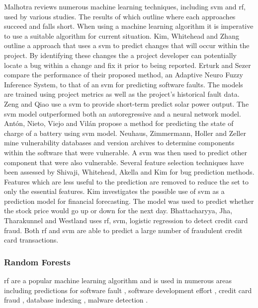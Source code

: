Malhotra reviews numerous machine learning techniques, including \gls{svm} and \gls{rf}, used by various studies\cite{Malhotra2015}. The results of which outline where each approaches succeed and falls short. When using a machine learning algorithm it is imperative to use a suitable algorithm for current situation. Kim, Whitehead and Zhang outline a approach that uses a \gls{svm} to predict changes that will occur within the project\cite{Kim2008}. By identifying these changes the a project developer can potentially locate a bug within a change and fix it prior to being reported. Erturk and Sezer compare the performance of their proposed method, an Adaptive Neuro Fuzzy Inference System, to that of an \gls{svm} for predicting software faults\cite{Erturk2015}. The models are trained using project metrics as well as the project's historical fault data. Zeng and Qiao use a \gls{svm} to provide short-term predict solar power output\cite{Zeng2016}. The \gls{svm} model outperformed both an autoregressive and a neural network model. Ant{\'{o}}n, Nieto, Viejo and Vil{\'{a}}n propose a method for predicting the state of charge of a battery using \gls{svm} model\cite{Anton2013}. Neuhaus, Zimmermann, Holler and Zeller mine vulnerability databases and version archives to determine components within the software that were vulnerable\cite{Neuhaus2007}. A \gls{svm} was then used to predict other component that were also vulnerable. Several feature selection techniques have been assessed by Shivaji, Whitehead, Akella and Kim for bug prediction methods\cite{Shivaji2013}. Features which are less useful to the prediction are removed to reduce the set to only the essential features. Kim investigates the possible use of \gls{svm} as a prediction model for financial forecasting. The model was used to predict whether the stock price would go up or down for the next day. Bhattacharyya, Jha, Tharakunnel and Westland uses \gls{rf}, \gls{svm}, logistic regression to detect credit card fraud\cite{Westland2011}. Both \gls{rf} and \gls{svm} are able to predict a large number of fraudulent credit card transactions.

\subsubsection{Random Forests}
\label{subsec:random_forest_predictions}

\gls{rf} are a popular machine learning algorithm and is used in numerous areas including predictions for software fault \cite{Malhotra2015, Moeyersoms2015, Guo2004}, software development effort \cite{Moeyersoms2015}, credit card fraud \cite{Westland2011}, database indexing \cite{Yu2011}, malware detection \cite{Alam2013}. 

